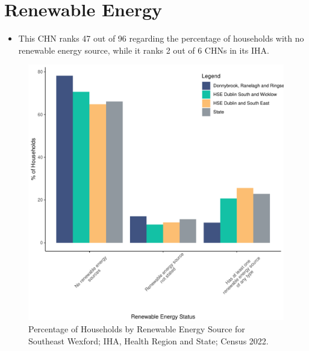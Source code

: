 \documentclass{article}
\begin{document}
\section{Renewable Energy}\label{sect:RE}
\begin{itemize}
\item This CHN ranks  47 out of 96 regarding the percentage of households with no renewable energy source, while it ranks   2 out of 6 CHNs in its IHA.
\end{itemize}
\begin{figure}[H]
	\centering
	\includegraphics[width = 140mm]{../figures/RenewableEnergyED.pdf}
	\caption{Percentage of Households by Renewable Energy Source for Southeast Wexford; IHA, Health Region and State; Census 2022.}
	\label{fig:vbnv}
	\end{figure}
\end{document}
